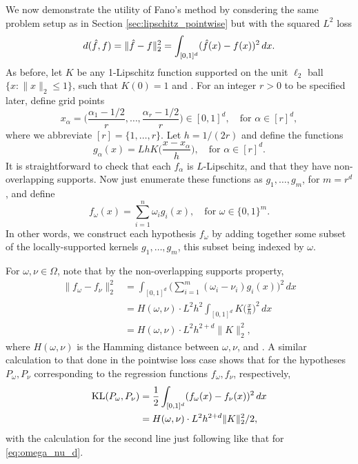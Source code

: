 \documentclass{article}
\begin{document}
We now demonstrate the utility of Fano's method by consdering the same problem
setup as in Section \ref{sec:lipschitz_pointwise} but with the squared $L^2$ loss 
\[
d(\hat{f}, f) = \|\hat{f} - f\|_2^2 = \int_{[0,1]^d} (\hat{f}(x) - f(x))^2 \, dx. 
\]
As before, let $K$ be any 1-Lipschitz function supported on the unit $\ell_2$
ball $\{ x : \|x\|_2 \leq 1 \}$, such that $K(0) = 1$ and  . For an integer $r > 0$ to be specified later, define
grid points  
\[
x_\alpha = \bigg( \frac{\alpha_1-1/2}{r}, \dots, \frac{\alpha_r-1/2}{r} \bigg)
\in [0,1]^d, \quad \text{for $\alpha \in [r]^d$}, 
\]
where we abbreviate $[r] = \{1,\dots,r\}$. Let $h=1/(2r)$ and define the functions 
\[
g_\alpha(x) = Lh K \bigg( \frac{x - x_\alpha}{h} \bigg), \quad \text{for $\alpha
  \in [r]^d$}.
\]
It is straightforward to check that each $f_\alpha$ is $L$-Lipschitz, and that
they have non-overlapping supports. Now just enumerate these functions as
$g_1,\dots,g_m$, for $m = r^d$, and define  
\[
f_\omega(x) = \sum_{i=1}^n \omega_i g_i(x), \quad \text{for $\omega \in
  \{0,1\}^m$}.  
\]
In other words, we construct each hypothesis $f_\omega$ by adding together some
subset of the locally-supported kernels $g_1,\dots,g_m$, this subset being
indexed by $\omega$. 

For $\omega,\nu \in \Omega$, note that by the non-overlapping supports property, 
\begin{align}
\nonumber
\| f_\omega - f_\nu \|_2^2 
&= \int_{[0,1]^d} \bigg( \sum_{i=1}^m (\omega_i - \nu_i) g_i(x) \bigg)^2 \, dx
  \\    
\nonumber
&= H(\omega, \nu) \cdot L^2 h^2 \int_{[0,1]^d} K \bigg( \frac{x}{h} \bigg)^2 \,
  dx \\ 
\label{eq:omega_nu_d}
&= H(\omega, \nu) \cdot L^2 h^{2+d} \|K\|_2^2,
\end{align}
where $H(\omega, \nu)$ is the Hamming distance between $\omega,\nu$, and  
. A similar calculation to that done in
the pointwise loss case shows that for the hypotheses $P_\omega,P_\nu$
corresponding to the regression functions $f_\omega,f_\nu$, respectively,  
\begin{align}
\nonumber
\mathrm{KL}(P_\omega,P_\nu) 
&= \frac{1}{2} \int_{[0,1]^d} (f_\omega(x) - f_\nu(x))^2 \, dx \\ 
\label{eq:omega_nu_kl}
&= H(\omega, \nu) \cdot L^2 h^{2+d} \|K\|_2^2 / 2,
\end{align}
with the calculation for the second line just following like that for
\eqref{eq:omega_nu_d}.  
\end{document}

